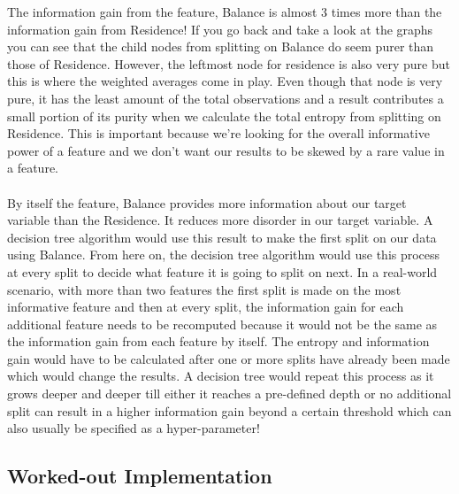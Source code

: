     The information gain from the feature, Balance is almost 3 times more than the information gain from Residence! If you go back and take a look at the graphs you can see that the child nodes from splitting on Balance do seem purer than those of Residence. However, the leftmost node for residence is also very pure but this is where the weighted averages come in play. Even though that node is very pure, it has the least amount of the total observations and a result contributes a small portion of its purity when we calculate the total entropy from splitting on Residence. This is important because we’re looking for the overall informative power of a feature and we don’t want our results to be skewed by a rare value in a feature.
    \\ \\
    By itself the feature, Balance provides more information about our target variable than the Residence. It reduces more disorder in our target variable. A decision tree algorithm would use this result to make the first split on our data using Balance. From here on, the decision tree algorithm would use this process at every split to decide what feature it is going to split on next. In a real-world scenario, with more than two features the first split is made on the most informative feature and then at every split, the information gain for each additional feature needs to be recomputed because it would not be the same as the information gain from each feature by itself. The entropy and information gain would have to be calculated after one or more splits have already been made which would change the results. A decision tree would repeat this process as it grows deeper and deeper till either it reaches a pre-defined depth or no additional split can result in a higher information gain beyond a certain threshold which can also usually be specified as a hyper-parameter!
    \\

\subsection{Worked-out Implementation}


